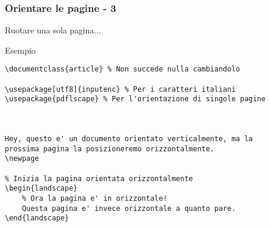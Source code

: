 \begin{frame}[fragile]
 \frametitle{Orientare le pagine - 3}
 
 Ruotare una sola pagina...
 \begin{exampleblock}{Esempio}
  \begin{lstlisting}[frame = single, title={Ruotare una pagina}] 
\documentclass{article} % Non succede nulla cambiandolo

\usepackage[utf8]{inputenc} % Per i caratteri italiani
\usepackage{pdflscape} % Per l'orientazione di singole pagine



Hey, questo e' un documento orientato verticalmente, ma la 
prossima pagina la posizioneremo orizzontalmente.
\newpage

% Inizia la pagina orientata orizzontalmente
\begin{landscape}
    % Ora la pagina e' in orizzontale!
    Questa pagina e' invece orizzontale a quanto pare.
\end{landscape}


  \end{lstlisting}
 \end{exampleblock}

\end{frame}
